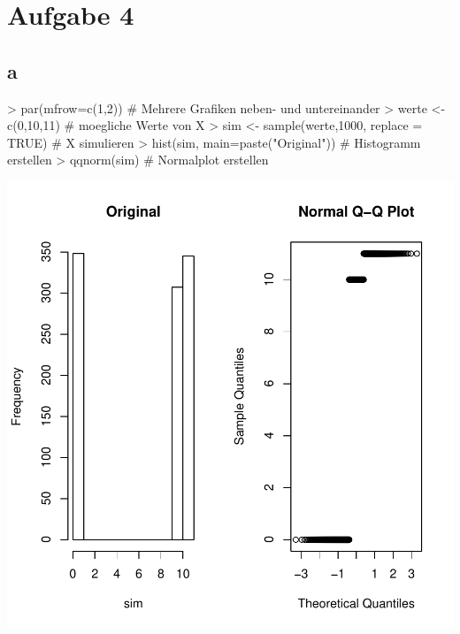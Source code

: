 

\section{Aufgabe 4}

\subsection{a}
\begin{Schunk}
\begin{Sinput}
> par(mfrow=c(1,2)) # Mehrere Grafiken neben- und untereinander
> werte <- c(0,10,11) # moegliche Werte von X
> sim <- sample(werte,1000, replace = TRUE) # X simulieren
> hist(sim, main=paste("Original")) # Histogramm erstellen
> qqnorm(sim) # Normalplot erstellen
\end{Sinput}
\end{Schunk}
\includegraphics{sw08_4-001}

